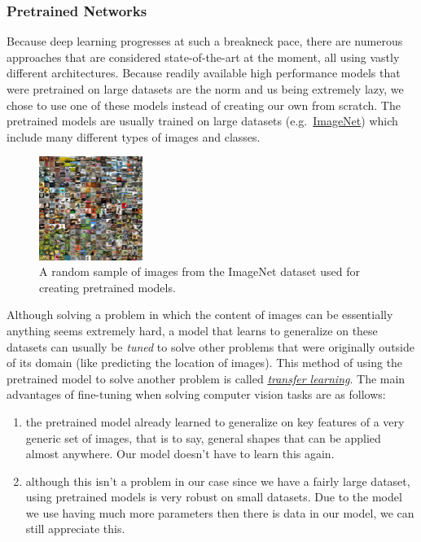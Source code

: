 \documentclass[]{article}
\providecommand{\tightlist}{%
  \setlength{\itemsep}{0pt}\setlength{\parskip}{0pt}}
\begin{document}
\hypertarget{pretrained-networks}{%
\subsubsection{Pretrained Networks}\label{pretrained-networks}}

Because deep learning progresses at such a breakneck pace, there are
numerous approaches that are considered state-of-the-art at the moment,
all using vastly different architectures. Because readily available high
performance models that were pretrained on large datasets are the norm
and us being extremely lazy, we chose to use one of these models instead
of creating our own from scratch. The pretrained models are usually
trained on large datasets
(e.g.~\href{https://www.image-net.org/}{ImageNet}) which include many
different types of images and classes.

\begin{figure}
\centering
\includegraphics[width=0.3\textwidth,height=\textheight]{./tex2pdf.-3ffa51a14b505aec/d3615cb3b505c54d0dd60b16d74145a19a2bc526.jpg}
\caption{A random sample of images from the ImageNet dataset used for
creating pretrained models.}
\end{figure}

Although solving a problem in which the content of images can be
essentially anything seems extremely hard, a model that learns to
generalize on these datasets can usually be \emph{tuned} to solve other
problems that were originally outside of its domain (like predicting the
location of images). This method of using the pretrained model to solve
another problem is called
\href{https://www.youtube.com/watch?v=yofjFQddwHE}{\emph{transfer
learning}}. The main advantages of fine-tuning when solving computer
vision tasks are as follows:

\begin{enumerate}
\def\labelenumi{\arabic{enumi}.}
\tightlist
\item
  the pretrained model already learned to generalize on key features of
  a very generic set of images, that is to say, general shapes that can
  be applied almost anywhere. Our model doesn't have to learn this
  again.
\item
  although this isn't a problem in our case since we have a fairly large
  dataset, using pretrained models is very robust on small datasets. Due
  to the model we use having much more parameters then there is data in
  our model, we can still appreciate this.
\end{enumerate}
\end{document}
